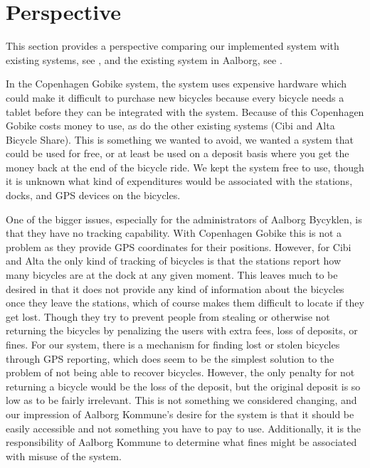 \section{Perspective}
This section provides a perspective comparing our implemented system with existing systems, see , and the existing system in Aalborg, see .

In the Copenhagen Gobike system, the system uses expensive hardware which could make it difficult to purchase new bicycles because every bicycle needs a tablet before they can be integrated with the system.
Because of this Copenhagen Gobike costs money to use, as do the other existing systems (Cibi and Alta Bicycle Share). 
This is something we wanted to avoid, we wanted a system that could be used for free, or at least be used on a deposit basis where you get the money back at the end of the bicycle ride. 
We kept the system free to use, though it is unknown what kind of expenditures would be associated with the stations, docks, and GPS devices on the bicycles. 

One of the bigger issues, especially for the administrators of Aalborg Bycyklen, is that they have no tracking capability. 
With Copenhagen Gobike this is not a problem as they provide GPS coordinates for their positions.
However, for Cibi and Alta the only kind of tracking of bicycles is that the stations report how many bicycles are at the dock at any given moment.
This leaves much to be desired in that it does not provide any kind of information about the bicycles once they leave the stations, which of course makes them difficult to locate if they get lost.
Though they try to prevent people from stealing or otherwise not returning the bicycles by penalizing the users with extra fees, loss of deposits, or fines.
For our system, there is a mechanism for finding lost or stolen bicycles through GPS reporting, which does seem to be the simplest solution to the problem of not being able to recover bicycles.
However, the only penalty for not returning a bicycle would be the loss of the deposit, but the original deposit is so low as to be fairly irrelevant.
This is not something we considered changing, and our impression of Aalborg Kommune's desire for the system is that it should be easily accessible and not something you have to pay to use.
Additionally, it is the responsibility of Aalborg Kommune to determine what fines might be associated with misuse of the system.


